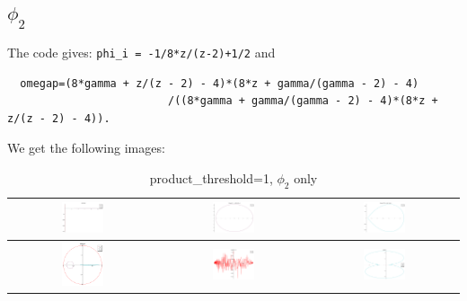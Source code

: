 \documentclass[a4paper,10pt]{article}
\begin{document}
 \subsection{$\phi_2$}
 The code gives: \verb?phi_i = -1/8*z/(z-2)+1/2? and
 \begin{verbatim}
  omegap=(8*gamma + z/(z - 2) - 4)*(8*z + gamma/(gamma - 2) - 4)
                         /((8*gamma + gamma/(gamma - 2) - 4)*(8*z + z/(z - 2) - 4)).
 \end{verbatim}
 
 We get the following images:
 \begin{table}[!ht]
 \caption{product\_threshold=1, $\phi_2$ only}
 \begin{tabular}{|c|c|c|}
  \hline
  \includegraphics[width=0.3\textwidth]{PT_1_z1_2.png} &
  \includegraphics[width=0.3\textwidth]{PT_1_C1z1_2.png} &
  \includegraphics[width=0.3\textwidth]{PT_1_C2z1_2.png} \\ \hline
  \includegraphics[width=0.3\textwidth]{PT_1_z2_2.png} &
  \includegraphics[width=0.3\textwidth]{PT_1_zed_C0_2.png} &
  \includegraphics[width=0.3\textwidth]{PT_1_zed_2.png} \\ \hline
 \end{tabular}
 \end{table}
\end{document}
